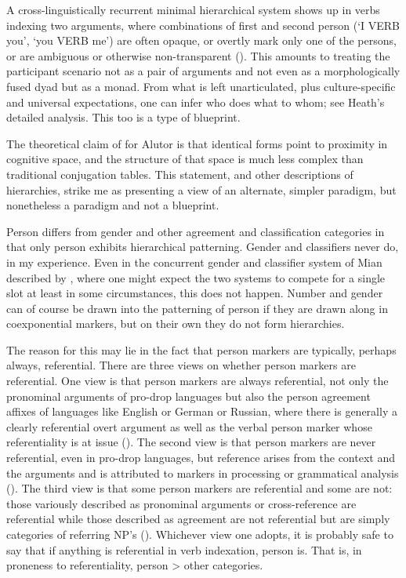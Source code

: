 \documentclass[output=collectionpaper]{langsci/langscibook}
\begin{document}
A cross-linguistically recurrent minimal hierarchical system shows up in verbs indexing two arguments, where combinations of first and second person (`I VERB you', `you VERB me') are often opaque, or overtly mark only one of the persons, or are ambiguous or otherwise non-transparent (\citealt{Heath1991,Heath1998}). This amounts to treating the participant scenario not as a pair of arguments and not even as a morphologically fused dyad but as a monad. From what is left unarticulated, plus culture-specific and universal expectations, one can infer who does what to whom; see Heath's detailed analysis. This too is a type of blueprint.

The theoretical claim of \citet[376]{Kibrik2003} for Alutor is that identical forms point to proximity in cognitive space, and the structure of that space is much less complex than traditional conjugation tables. This statement, and other descriptions of hierarchies, strike me as presenting a view of an alternate, simpler paradigm, but nonetheless a paradigm and not a blueprint.

Person differs from gender and other agreement and classification categories in that only person exhibits hierarchical patterning. Gender and classifiers never do, in my experience. Even in the concurrent gender and classifier system of Mian described by \citet{Corbett2016}, where one might expect the two systems to compete for a single slot at least in some circumstances, this does not happen. Number and gender can of course be drawn into the patterning of person if they are drawn along in coexponential markers, but on their own they do not form hierarchies.

The reason for this may lie in the fact that person markers are typically, perhaps always, referential. There are three views on whether person markers are referential. One view is that person markers are always referential, not only the pronominal arguments of pro-drop languages but also the person agreement affixes of languages like English or German or Russian, where there is generally a clearly referential overt argument as well as the verbal person marker whose referentiality is at issue (\citealt{Kibrik2011}). The second view is that person markers are never referential, even in pro-drop languages, but reference arises from the context and the arguments and is attributed to markers in processing or grammatical analysis (\citealt{Evans1999,Evans2003}). The third view is that some person markers are referential and some are not: those variously described as pronominal arguments or cross-reference are referential while those described as agreement are not referential but are simply categories of referring NP's (\citealt{Hengeveld2012}). Whichever view one adopts, it is probably safe to say that if anything is referential in verb indexation, person is. That is, in proneness to referentiality, person > other categories.
\end{document}
